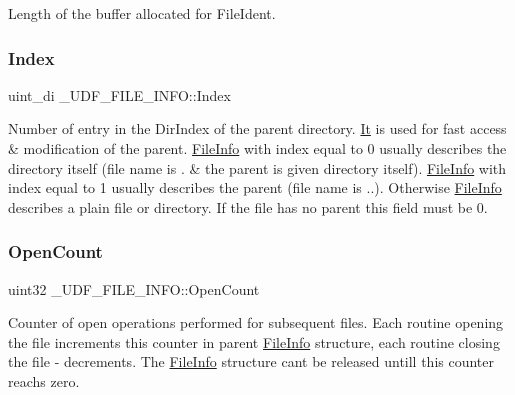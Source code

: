 Length of the buffer allocated for File\+Ident. \mbox{\label{struct___u_d_f___f_i_l_e___i_n_f_o_a97f61f59b02271c0d15c020c5db2d6ef}} 
\subsubsection{\texorpdfstring{Index}{Index}}
{\footnotesize\ttfamily uint\+\_\+di \+\_\+\+U\+D\+F\+\_\+\+F\+I\+L\+E\+\_\+\+I\+N\+F\+O\+::\+Index}

Number of entry in the Dir\+Index of the parent directory. \hyperlink{class_it}{It} is used for fast access \& modification of the parent. \hyperlink{struct_file_info}{File\+Info} with index equal to 0 usually describes the directory itself (file name is \textquotesingle{}.\textquotesingle{} \& the parent is given directory itself). \hyperlink{struct_file_info}{File\+Info} with index equal to 1 usually describes the parent (file name is \textquotesingle{}..\textquotesingle{}). Otherwise \hyperlink{struct_file_info}{File\+Info} describes a plain file or directory. If the file has no parent this field must be 0. \mbox{\label{struct___u_d_f___f_i_l_e___i_n_f_o_a63684f986b55c2670e8d814b5797c080}} 
\subsubsection{\texorpdfstring{Open\+Count}{OpenCount}}
{\footnotesize\ttfamily uint32 \+\_\+\+U\+D\+F\+\_\+\+F\+I\+L\+E\+\_\+\+I\+N\+F\+O\+::\+Open\+Count}

Counter of open operations performed for subsequent files. Each routine opening the file increments this counter in parent \hyperlink{struct_file_info}{File\+Info} structure, each routine closing the file -\/ decrements. The \hyperlink{struct_file_info}{File\+Info} structure can\textquotesingle{}t be released untill this counter reachs zero. \mbox{\label{struct___u_d_f___f_i_l_e___i_n_f_o_a97318fbf0ceee53b1ed74de061eee8ea}} 
